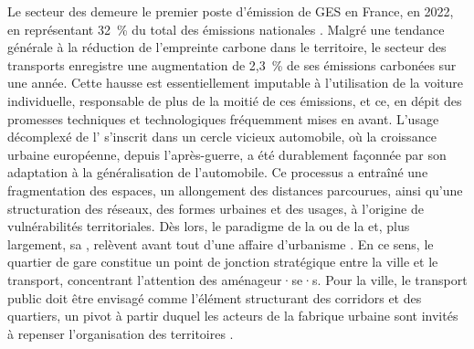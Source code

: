 \begin{refsegment}
Le secteur des  demeure le premier poste d'émission de \acrfull{GES} en France, en 2022, en représentant 32~\% du total des émissions nationales \textcolor{blue}{\autocite[41-53]{ministere_de_la_transition_ecologique_et_de_la_cohesion_des_territoires_chiffres_2024}}. Malgré une tendance générale à la réduction de l'empreinte carbone dans le territoire, le secteur des transports enregistre une augmentation de 2,3~\% de ses émissions carbonées sur une année. Cette hausse est essentiellement imputable à l'utilisation de la voiture individuelle, responsable de plus de la moitié de ces émissions, et ce, en dépit des promesses techniques et technologiques fréquemment mises en avant. L'usage décomplexé de l' s'inscrit dans un cercle vicieux automobile, où la croissance urbaine européenne, depuis l'après-guerre, a été durablement façonnée par son adaptation à la généralisation de l'automobile. Ce processus a entraîné une fragmentation des espaces, un allongement des distances parcourues, ainsi qu'une structuration des réseaux, des formes urbaines et des usages, à l'origine de vulnérabilités territoriales. Dès lors, le paradigme de la  ou de la  et, plus largement, sa , relèvent avant tout d'une affaire d'urbanisme \textcolor{blue}{\autocite{societe_francaise_des_urbanistes_decarbonation_2024}}. En ce sens, le quartier de gare constitue un point de jonction stratégique entre la ville et le transport, concentrant l'attention des aménageur·se·s. Pour  la ville, le transport public doit être envisagé comme l'élément structurant des corridors et des quartiers, un pivot à partir duquel les acteurs de la fabrique urbaine sont invités à repenser l'organisation des territoires \textcolor{blue}{\autocite[8]{boisclair_retisser_2013}}.%


\end{refsegment}
